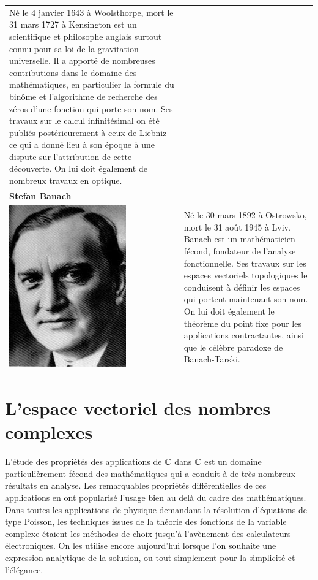 \begin{tabular}{ll}
\begin{minipage}{0.65\linewidth}
Né le  4 janvier 1643 à Woolsthorpe, mort le 31 mars 1727 à Kensington est un scientifique et philosophe anglais surtout connu pour sa loi de la gravitation universelle. Il a apporté de nombreuses contributions dans le domaine des mathématiques, en particulier la formule du binôme et l'algorithme de recherche des zéros d'une fonction qui porte son nom. Ses travaux sur le calcul infinitésimal on été publiés postérieurement à ceux de Liebniz ce qui a donné lieu à son époque à une dispute sur l'attribution de cette découverte. On lui doit également de nombreux travaux en optique.
\end{minipage}\\
\multicolumn{2}{l}{\textbf{Stefan Banach}} \\[10pt]
\begin{minipage}{0.2\linewidth}
\includegraphics[scale=0.3]{images/banach.jpg}
\end{minipage}
& 
\begin{minipage}{0.65\linewidth}
Né le 30 mars 1892 à Ostrowsko, mort le 31 août 1945 à Lviv. Banach est un mathématicien fécond, fondateur de l'analyse fonctionnelle. Ses travaux sur les espaces vectoriels topologiques le conduisent à définir les espaces qui portent maintenant son nom. On lui doit également le théorème du point fixe pour les applications contractantes, ainsi que le célèbre paradoxe de Banach-Tarski.
\end{minipage}
\end{tabular}

\section{L'espace vectoriel des nombres complexes}
L'étude des propriétés des applications de $\mathbb{C}$ dans $\mathbb{C}$ est un domaine particulièrement fécond des mathématiques qui a conduit à de très nombreux résultats en analyse. Les remarquables propriétés différentielles de ces applications en ont popularisé l'usage bien au delà du cadre des mathématiques. Dans toutes les applications de physique demandant la résolution d'équations de type Poisson, les techniques issues de la théorie des fonctions de la variable complexe étaient les méthodes de choix jusqu'à l'avènement des calculateurs électroniques. On les utilise encore aujourd'hui lorsque l'on souhaite une expression analytique de la solution, ou tout simplement pour la simplicité et l'élégance.  

